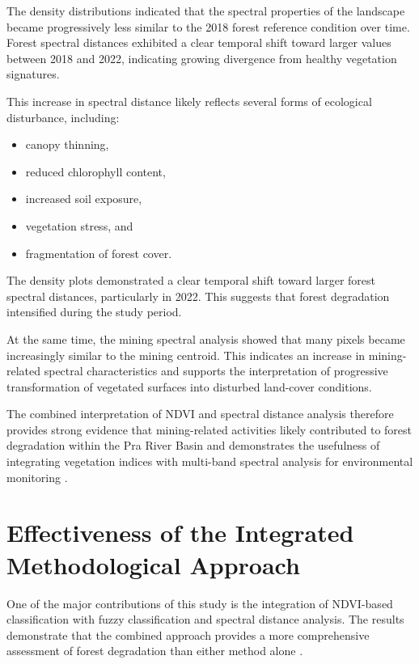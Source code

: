 \documentclass[a4paper,12pt]{report}
\begin{document}
The density distributions indicated that the spectral properties of the landscape became progressively less similar to the 2018 forest reference condition over time. Forest spectral distances exhibited a clear temporal shift toward larger values between 2018 and 2022, indicating growing divergence from healthy vegetation signatures.

This increase in spectral distance likely reflects several forms of ecological disturbance, including:

\begin{itemize}
\item canopy thinning,
\item reduced chlorophyll content,
\item increased soil exposure,
\item vegetation stress, and
\item fragmentation of forest cover.
\end{itemize}

The density plots demonstrated a clear temporal shift toward larger forest spectral distances, particularly in 2022. This suggests that forest degradation intensified during the study period.

At the same time, the mining spectral analysis showed that many pixels became increasingly similar to the mining centroid. This indicates an increase in mining-related spectral characteristics and supports the interpretation of progressive transformation of vegetated surfaces into disturbed land-cover conditions.

The combined interpretation of NDVI and spectral distance analysis therefore provides strong evidence that mining-related activities likely contributed to forest degradation within the Pra River Basin and demonstrates the usefulness of integrating vegetation indices with multi-band spectral analysis for environmental monitoring \citep{pettorelli2005ndvi,lu2004change}.

\section{Effectiveness of the Integrated Methodological Approach}

One of the major contributions of this study is the integration of NDVI-based classification with fuzzy classification and spectral distance analysis. The results demonstrate that the combined approach provides a more comprehensive assessment of forest degradation than either method alone \citep{pettorelli2005ndvi,lu2004change,tarazona2020monitoring}.
\end{document}
